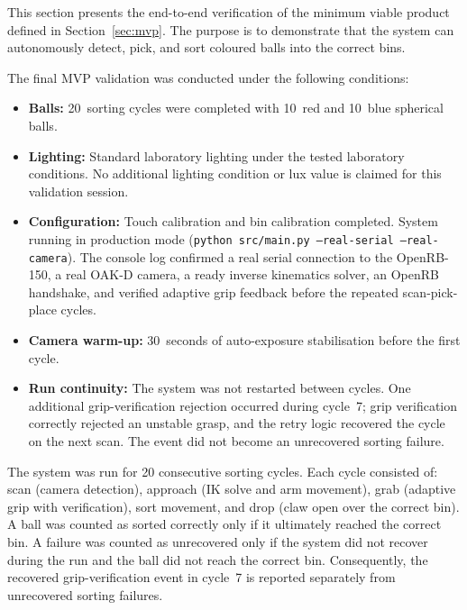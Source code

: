 \label{sec:mvp-verification}

This section presents the end-to-end verification of the minimum
viable product defined in Section~\ref{sec:mvp}. The purpose is to
demonstrate that the system can autonomously detect, pick, and
sort coloured balls into the correct bins.


The final MVP validation was conducted under the following
conditions:

\begin{itemize}
    \item \textbf{Balls:} 20~sorting cycles were completed with
    10~red and 10~blue spherical balls.
    \item \textbf{Lighting:} Standard laboratory lighting under
    the tested laboratory conditions. No additional lighting
    condition or lux value is claimed for this validation session.
    \item \textbf{Configuration:} Touch calibration and bin
    calibration completed. System running in production mode
    (\texttt{python src/main.py --real-serial --real-camera}).
    The console log confirmed a real serial connection to the
    OpenRB-150, a real OAK-D camera, a ready inverse kinematics
    solver, an OpenRB handshake, and verified adaptive grip
    feedback before the repeated scan-pick-place cycles.
    \item \textbf{Camera warm-up:} 30~seconds of auto-exposure
    stabilisation before the first cycle.
    \item \textbf{Run continuity:} The system was not restarted
    between cycles. One additional grip-verification rejection
    occurred during cycle~7; grip verification correctly rejected
    an unstable grasp, and the retry logic recovered the cycle on
    the next scan. The event did not become an unrecovered sorting
    failure.
\end{itemize}


The system was run for 20 consecutive sorting cycles. Each cycle
consisted of: scan (camera detection), approach (IK solve and arm
movement), grab (adaptive grip with verification), sort movement,
and drop (claw open over the correct bin). A ball was counted as
sorted correctly only if it ultimately reached the correct bin.
A failure was counted as unrecovered only if the system did not
recover during the run and the ball did not reach the correct
bin. Consequently, the recovered grip-verification event in
cycle~7 is reported separately from unrecovered sorting failures.

